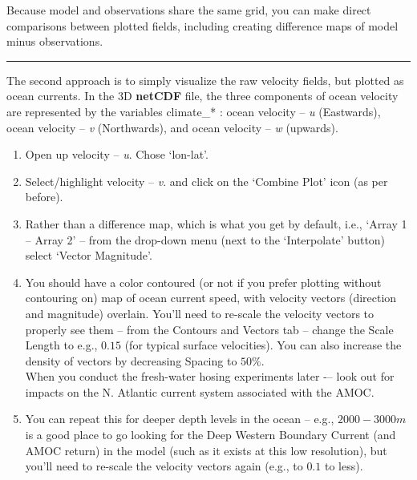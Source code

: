 Because model and observations share the same grid, you can make direct comparisons between plotted fields, including creating difference maps of model minus observations.

\vspace{1mm}\noindent\rule{4cm}{0.5pt}\vspace{2mm}

\noindent The second approach is to simply visualize the raw velocity fields, but plotted as ocean currents. In the 3D \textbf{netCDF} file, the three components of ocean velocity are represented by the variables \textsf{\footnotesize climate\_* }: ocean velocity – \textit{u} (Eastwards), ocean velocity – \textit{v} (Northwards), and ocean velocity – \textit{w} (upwards).

\vspace{1mm}
\begin{enumerate}[noitemsep]
\vspace{1mm}
\item  Open up velocity – \textit{u}. Chose ‘lon-lat’.
\vspace{1mm}
\item Select/highlight velocity – \textit{v}. and click on the \textsf{\footnotesize ‘Combine Plot’ } icon (as per before).
\vspace{1mm}
\item Rather than a difference map, which is what you get by default, i.e., \textsf{\footnotesize ‘Array 1 – Array 2’} – from the drop-down menu (next to the \textsf{\footnotesize ‘Interpolate’ } button) select \textsf{\footnotesize ‘Vector Magnitude’}.
\vspace{1mm}
\item You should have a color contoured (or not if you prefer plotting without contouring on) map of ocean current speed, with velocity vectors (direction and magnitude) overlain. You’ll need to re-scale the velocity vectors to properly see them – from the \textsf{\footnotesize Contours and Vectors} tab – change the \textsf{\footnotesize Scale Length} to e.g., $0.15$ (for typical surface velocities). You can also increase the density of vectors by decreasing \textsf{\footnotesize Spacing} to $50\%$.
\\When you conduct the fresh-water hosing experiments later -– look out for impacts on the N. Atlantic current system associated with the AMOC.
\vspace{1mm}
\item You can repeat this for deeper depth levels in the ocean – e.g., $2000-3000 m$ is a good place to go looking for the Deep Western Boundary Current (and AMOC return) in the model (such as it exists at this low resolution), but you’ll need to re-scale the velocity vectors again (e.g., to $0.1$ to less).
\end{enumerate}

